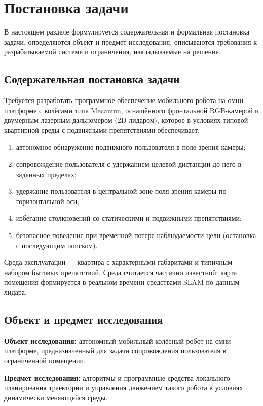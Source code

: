 \section{Постановка задачи}
\label{sec:problem}

В настоящем разделе формулируется содержательная и формальная постановка
задачи, определяются объект и предмет исследования, описываются требования
к разрабатываемой системе и ограничения, накладываемые на решение.

\subsection{Содержательная постановка задачи}

Требуется разработать программное обеспечение мобильного робота на
омни-платформе с колёсами типа Mecanum, оснащённого фронтальной
RGB-камерой и двумерным лазерным дальномером (2D-лидаром), которое в
условиях типовой квартирной среды с подвижными препятствиями обеспечивает:
\begin{enumerate}
    \item автономное обнаружение подвижного пользователя в поле зрения
          камеры;
    \item сопровождение пользователя с удержанием целевой дистанции до
          него в заданных пределах;
    \item удержание пользователя в центральной зоне поля зрения камеры
          по горизонтальной оси;
    \item избегание столкновений со статическими и подвижными
          препятствиями;
    \item безопасное поведение при временной потере наблюдаемости цели
          (остановка с последующим поиском).
\end{enumerate}

Среда эксплуатации --- квартира с характерными габаритами и типичным
набором бытовых препятствий. Среда считается частично известной: карта
помещения формируется в реальном времени средствами SLAM по данным лидара.

\subsection{Объект и предмет исследования}

\textbf{Объект исследования:} автономный мобильный колёсный робот на
омни-платформе, предназначенный для задачи сопровождения пользователя в
ограниченной помещении.

\textbf{Предмет исследования:} алгоритмы и программные средства
локального планирования траектории и управления движением такого робота
в условиях динамически меняющейся среды.

